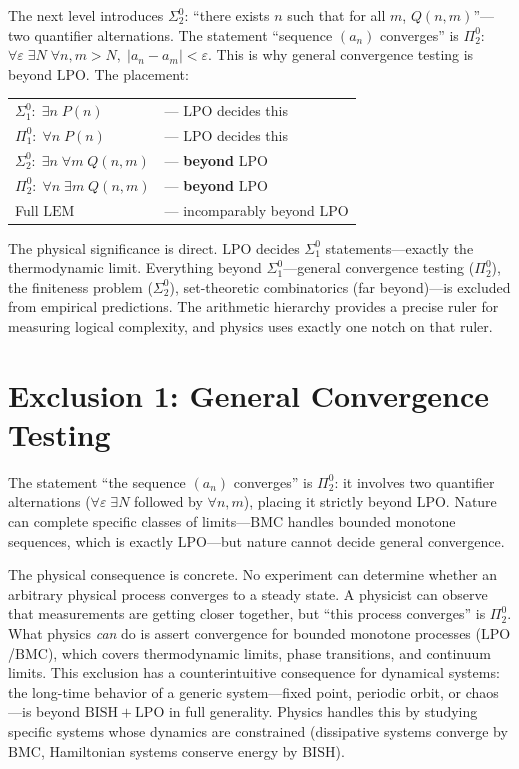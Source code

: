 \documentclass[11pt,a4paper]{report}
\theoremstyle{plain}
\theoremstyle{definition}
\theoremstyle{remark}
\newcommand{\BISH}{\mathrm{BISH}}
\newcommand{\LPO}{\mathrm{LPO}}
\newcommand{\BMC}{\mathrm{BMC}}
\newcommand{\LEM}{\mathrm{LEM}}
\begin{document}
The next level introduces $\Sigma^0_2$: ``there exists $n$ such that for all $m$, $Q(n,m)$''---two quantifier alternations. The statement ``sequence $(a_n)$ converges'' is $\Pi^0_2$: $\forall \varepsilon\;\exists N\;\forall n,m > N,\; |a_n - a_m| < \varepsilon$. This is why general convergence testing is beyond $\LPO$. The placement:
\begin{center}
\begin{tabular}{@{}ll@{}}
$\Sigma^0_1\colon\; \exists n\; P(n)$ & --- $\LPO$ decides this \\
$\Pi^0_1\colon\; \forall n\; P(n)$ & --- $\LPO$ decides this \\
$\Sigma^0_2\colon\; \exists n\;\forall m\; Q(n,m)$ & --- \textbf{beyond} $\LPO$ \\
$\Pi^0_2\colon\; \forall n\;\exists m\; Q(n,m)$ & --- \textbf{beyond} $\LPO$ \\
Full $\LEM$ & --- incomparably beyond $\LPO$
\end{tabular}
\end{center}

The physical significance is direct. $\LPO$ decides $\Sigma^0_1$ statements---exactly the thermodynamic limit. Everything beyond $\Sigma^0_1$---general convergence testing ($\Pi^0_2$), the finiteness problem ($\Sigma^0_2$), set-theoretic combinatorics (far beyond)---is excluded from empirical predictions. The arithmetic hierarchy provides a precise ruler for measuring logical complexity, and physics uses exactly one notch on that ruler.

\section{Exclusion 1: General Convergence Testing}

The statement ``the sequence $(a_n)$ converges'' is $\Pi^0_2$: it involves two quantifier alternations ($\forall\varepsilon\;\exists N$ followed by $\forall n,m$), placing it strictly beyond $\LPO$. Nature can complete specific classes of limits---$\BMC$ handles bounded monotone sequences, which is exactly $\LPO$---but nature cannot decide general convergence.

The physical consequence is concrete. No experiment can determine whether an arbitrary physical process converges to a steady state. A physicist can observe that measurements are getting closer together, but ``this process converges'' is $\Pi^0_2$. What physics \emph{can} do is assert convergence for bounded monotone processes ($\LPO$/$\BMC$), which covers thermodynamic limits, phase transitions, and continuum limits. This exclusion has a counterintuitive consequence for dynamical systems: the long-time behavior of a generic system---fixed point, periodic orbit, or chaos---is beyond $\BISH+\LPO$ in full generality. Physics handles this by studying specific systems whose dynamics are constrained (dissipative systems converge by $\BMC$, Hamiltonian systems conserve energy by $\BISH$).
\end{document}
